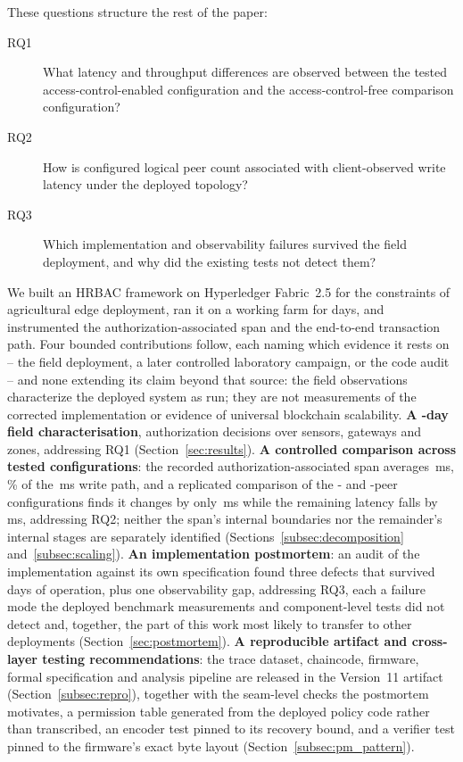 \documentclass[a4paper,fleqn]{cas-sc}
\begin{document}
These questions structure the rest of the paper:

\begin{description}
\item[RQ1] What latency and throughput differences are observed between the
  tested access-control-enabled configuration and the access-control-free
  comparison configuration?
\item[RQ2] How is configured logical peer count associated with
  client-observed write latency under the deployed topology?
\item[RQ3] Which implementation and observability failures survived the
  field deployment, and why did the existing tests not detect them?
\end{description}

We built an HRBAC framework on Hyperledger Fabric~2.5 for the constraints of
agricultural edge deployment, ran it on a working farm for \DeployDays{}
days, and instrumented the authorization-associated span and the end-to-end
transaction path. Four bounded contributions follow, each naming which
evidence it rests on -- the field deployment, a later controlled
laboratory campaign, or the code audit -- and none extending its claim
beyond that source: the field observations characterize the deployed
system as run; they are not measurements of the corrected implementation
or evidence of universal blockchain scalability. \textbf{A \DeployDays{}-day
field characterisation}, \TotalDecisions{} authorization decisions over
\DeploySensors{} sensors, \DeployGateways{} gateways and \DeployZones{}
zones, addressing RQ1 (Section~\ref{sec:results}).
\textbf{A controlled comparison across tested configurations}: the recorded
authorization-associated span averages \PartAccess\,ms,
\PartAccessPct\% of the \PartTotal\,ms write path, and a replicated
comparison of the \ScaleMinPeers{}- and \ScaleMaxPeers{}-peer configurations
finds it changes by only \PartTostDiff\,ms while the remaining latency
falls by \PartEndorser\,ms, addressing RQ2; neither the span's internal
boundaries nor the remainder's internal stages are separately identified
(Sections~\ref{subsec:decomposition} and~\ref{subsec:scaling}).
\textbf{An implementation postmortem}: an audit of the implementation
against its own specification found three defects that survived
\DeployDays{} days of operation, plus one observability gap, addressing
RQ3, each a failure mode the deployed benchmark measurements and
component-level tests did not detect and, together, the part of this work
most likely to transfer to other
deployments (Section~\ref{sec:postmortem}). \textbf{A reproducible
artifact and cross-layer testing recommendations}: the trace dataset,
chaincode, firmware, formal specification and analysis pipeline are
released in the Version~11 artifact (Section~\ref{subsec:repro}), together with
the seam-level checks the postmortem motivates, a permission table
generated from the deployed policy code rather than transcribed, an
encoder test pinned to its recovery bound, and a verifier test pinned to
the firmware's exact byte layout (Section~\ref{subsec:pm_pattern}).
\end{document}

